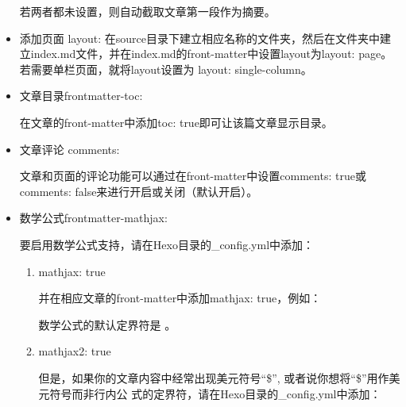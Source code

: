 \documentclass[letterpaper,12pt,english]{sphinxmanual}
\begin{document}
\begin{itemize}
若两者都未设置，则自动截取文章第一段作为摘要。

\item {} 
添加页面 layout:
在source目录下建立相应名称的文件夹，然后在文件夹中建立index.md文件，并在index.md的front-matter中设置layout为layout: page。若需要单栏页面，就将layout设置为 layout: single-column。

\item {} 
文章目录frontmatter-toc:

\label{\detokenize{001software/001install/001._u7f51_u7ad9/hexo:frontmatter-toc}}
在文章的front-matter中添加toc: true即可让该篇文章显示目录。

\item {} 
文章评论 comments:

文章和页面的评论功能可以通过在front-matter中设置comments: true或comments: false来进行开启或关闭（默认开启）。

\item {} 
数学公式frontmatter-mathjax:

\label{\detokenize{001software/001install/001._u7f51_u7ad9/hexo:frontmatter-mathjax}}
要启用数学公式支持，请在Hexo目录的\_config.yml中添加：
\begin{enumerate}
%
\item {} 
mathjax: true

并在相应文章的front-matter中添加mathjax: true，例如：

\begin{sphinxVerbatim}[commandchars=\\\{\}]
  
  
 
 
\end{sphinxVerbatim}

数学公式的默认定界符是  。

\item {} 
mathjax2: true

但是，如果你的文章内容中经常出现美元符号“\$”, 或者说你想将“\$”用作美元符号而非行内公     式的定界符，请在Hexo目录的\_config.yml中添加：


\end{enumerate}
\end{itemize}
\end{document}
